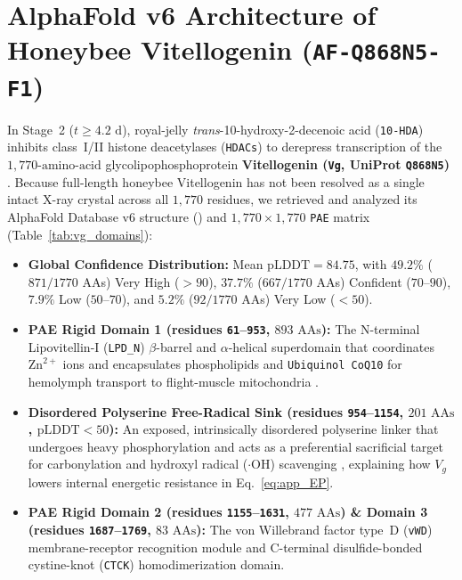\documentclass[11pt]{article}
\begin{document}
\section{AlphaFold v6 Architecture of Honeybee Vitellogenin (\texttt{AF-Q868N5-F1})}

In Stage~2 ($t \ge 4.2\text{ d}$), royal-jelly \textit{trans}-10-hydroxy-2-decenoic acid (\texttt{10-HDA}) inhibits class~I/II histone deacetylases (\texttt{HDACs}) \cite{spannhoff2011hda} to derepress transcription of the $1{,}770\text{-amino-acid}$ glycolipophosphoprotein \textbf{Vitellogenin (\texttt{Vg}, UniProt \texttt{Q868N5})} \cite{seehuus2006bee,leipart2022vitellogenin,havukainen2013vitellogenin}. Because full-length honeybee Vitellogenin has not been resolved as a single intact X-ray crystal across all $1{,}770$ residues, we retrieved and analyzed its AlphaFold Database v6 \cite{jumper2021alphafold,varadi2024afdb} structure () and $1{,}770\times 1{,}770$ \texttt{PAE} matrix (Table~\ref{tab:vg_domains}):
\begin{itemize}
  \item \textbf{Global Confidence Distribution:} Mean $\mathrm{pLDDT} = 84.75$, with $49.2\%$ ($871/1770$ AAs) Very High ($>90$), $37.7\%$ ($667/1770$ AAs) Confident ($70\text{--}90$), $7.9\%$ Low ($50\text{--}70$), and $5.2\%$ ($92/1770$ AAs) Very Low ($<50$).
  \item \textbf{PAE Rigid Domain 1 (residues \texttt{61}--\texttt{953}, $893\text{ AAs}$):} The N-terminal Lipovitellin-I (\texttt{LPD\_N}) $\beta$-barrel and $\alpha$-helical superdomain that coordinates $\mathrm{Zn}^{2+}$ ions and encapsulates phospholipids and \texttt{Ubiquinol CoQ10} for hemolymph transport to flight-muscle mitochondria \cite{leipart2022vitellogenin,havukainen2013vitellogenin}.
  \item \textbf{Disordered Polyserine Free-Radical Sink (residues \texttt{954}--\texttt{1154}, $201\text{ AAs}$, $\mathrm{pLDDT} < 50$):} An exposed, intrinsically disordered polyserine linker that undergoes heavy phosphorylation and acts as a preferential sacrificial target for carbonylation and hydroxyl radical ($\cdot\mathrm{OH}$) scavenging \cite{seehuus2006bee}, explaining how $V_g$ lowers internal energetic resistance in Eq.~\eqref{eq:app_EP}.
  \item \textbf{PAE Rigid Domain 2 (residues \texttt{1155}--\texttt{1631}, $477\text{ AAs}$) \& Domain 3 (residues \texttt{1687}--\texttt{1769}, $83\text{ AAs}$):} The von Willebrand factor type~D (\texttt{vWD}) membrane-receptor recognition module and C-terminal disulfide-bonded cystine-knot (\texttt{CTCK}) homodimerization domain.
\end{itemize}
\end{document}
